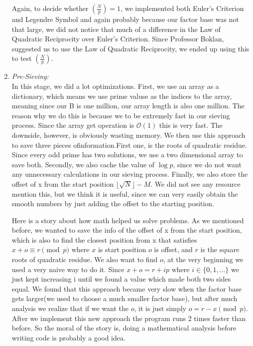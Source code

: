 \documentclass[12pt]{article} %
\newcommand{\itemgap}[1][2]{\vspace{#1mm}}
\newcommand{\legendre}[2]{\left(\frac{#1}{#2}\right)}
\begin{document}
\begin{enumerate}
		Again, to decide whether $\legendre{N}{p} = 1$, we implemented both Euler's Criterion and Legendre Symbol and again probably because our factor base was not that large, we did not notice that much of a difference in the Law of Quadratic Reciprocity over Euler's Criterion. Since Professor Boklan, suggested us to use the Law of Quadratic Reciprocity, we ended up using this to test $\legendre{N}{p}$.
		
		\item \textit{Pre-Sieving:} \itemgap
		\\ In this stage, we did a lot optimizations. First, we use an array as a dictionary, which means we use prime valuse as the indices to the array, meaning since our B is one million, our array length is also one million. The reason why we do this is because we to be extremely fast in our sieving process. Since the array get operation is $\mathcal{O}(1)$ this is very fast. The downside, however, is obviously wasting memory. We then use this approach to save three pieces ofinformation.First one, is the roots of quadratic residue. Since every odd prime has two solutions, we use a two dimensional array to save both. Secondly, we also cache the value of $\log p$, since we do not want any unnecessary calculations in our sieving process. Finally, we also store the offset of x from the start position $\lfloor \sqrt{N} \rfloor - M$. We did not see any resource mention this, but we think it is useful, since we can very easily obtain the smooth numbers by just adding the offset to the starting position. 
		
		Here is a story about how math helped us solve problems. As we mentioned before, we wanted to save the info of the offset of x from the start position, which is also to find the closest position from x that satisfies $x+o \equiv r \pmod{p}$ where $x$ is start position $o$ is offset, and $r$ is the square roots of quadratic residue. We also want to find $o$, at the very beginning we used a very naive way to do it. Since $x+o=r+ip$ where $i \in \{0,1,\dots\}$ we just kept increasing i until we found a value which made both two sides equal. We found that this approach became very slow when the factor base gets larger(we used to choose a much smaller factor base), but after much analysis we realize that if we want the $o$, it is just simply $o = r-x \pmod{p}$. After we implement this new approach the program runs 2 times faster than before. So the moral of the story is, doing a mathematical analysis before writing code is probably a good idea.
		

\end{enumerate}
\end{document}
